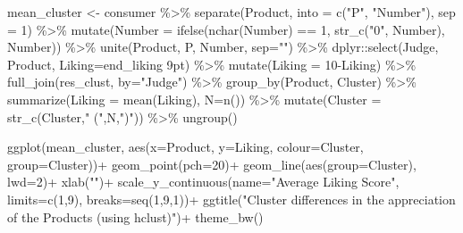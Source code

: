 \documentclass[
]{book}
\newenvironment{Shaded}{\begin{snugshade}}{\end{snugshade}}
\newcommand{\AttributeTok}[1]{\textcolor[rgb]{0.77,0.63,0.00}{#1}}
\newcommand{\DecValTok}[1]{\textcolor[rgb]{0.00,0.00,0.81}{#1}}
\newcommand{\FunctionTok}[1]{\textcolor[rgb]{0.00,0.00,0.00}{#1}}
\newcommand{\NormalTok}[1]{#1}
\newcommand{\OtherTok}[1]{\textcolor[rgb]{0.56,0.35,0.01}{#1}}
\newcommand{\SpecialCharTok}[1]{\textcolor[rgb]{0.00,0.00,0.00}{#1}}
\newcommand{\StringTok}[1]{\textcolor[rgb]{0.31,0.60,0.02}{#1}}
\begin{document}
\begin{Shaded}
\begin{Highlighting}[]
\NormalTok{mean\_cluster }\OtherTok{\textless{}{-}}\NormalTok{ consumer }\SpecialCharTok{\%\textgreater{}\%} 
  \FunctionTok{separate}\NormalTok{(Product, }\AttributeTok{into =} \FunctionTok{c}\NormalTok{(}\StringTok{"P"}\NormalTok{, }\StringTok{"Number"}\NormalTok{), }\AttributeTok{sep =} \DecValTok{1}\NormalTok{) }\SpecialCharTok{\%\textgreater{}\%} 
  \FunctionTok{mutate}\NormalTok{(}\AttributeTok{Number =} \FunctionTok{ifelse}\NormalTok{(}\FunctionTok{nchar}\NormalTok{(Number) }\SpecialCharTok{==} \DecValTok{1}\NormalTok{, }\FunctionTok{str\_c}\NormalTok{(}\StringTok{"0"}\NormalTok{, Number), Number)) }\SpecialCharTok{\%\textgreater{}\%} 
  \FunctionTok{unite}\NormalTok{(Product, P, Number, }\AttributeTok{sep=}\StringTok{""}\NormalTok{) }\SpecialCharTok{\%\textgreater{}\%} 
\NormalTok{  dplyr}\SpecialCharTok{::}\FunctionTok{select}\NormalTok{(Judge, Product, }\AttributeTok{Liking=}\StringTok{\textasciigrave{}}\AttributeTok{end\_liking 9pt}\StringTok{\textasciigrave{}}\NormalTok{) }\SpecialCharTok{\%\textgreater{}\%}
  \FunctionTok{mutate}\NormalTok{(}\AttributeTok{Liking =} \DecValTok{10}\SpecialCharTok{{-}}\NormalTok{Liking) }\SpecialCharTok{\%\textgreater{}\%} 
  \FunctionTok{full\_join}\NormalTok{(res\_clust, }\AttributeTok{by=}\StringTok{"Judge"}\NormalTok{) }\SpecialCharTok{\%\textgreater{}\%} 
  \FunctionTok{group\_by}\NormalTok{(Product, Cluster) }\SpecialCharTok{\%\textgreater{}\%} 
  \FunctionTok{summarize}\NormalTok{(}\AttributeTok{Liking =} \FunctionTok{mean}\NormalTok{(Liking), }\AttributeTok{N=}\FunctionTok{n}\NormalTok{()) }\SpecialCharTok{\%\textgreater{}\%} 
  \FunctionTok{mutate}\NormalTok{(}\AttributeTok{Cluster =} \FunctionTok{str\_c}\NormalTok{(Cluster,}\StringTok{" ("}\NormalTok{,N,}\StringTok{")"}\NormalTok{)) }\SpecialCharTok{\%\textgreater{}\%} 
  \FunctionTok{ungroup}\NormalTok{()}

\FunctionTok{ggplot}\NormalTok{(mean\_cluster, }\FunctionTok{aes}\NormalTok{(}\AttributeTok{x=}\NormalTok{Product, }\AttributeTok{y=}\NormalTok{Liking, }\AttributeTok{colour=}\NormalTok{Cluster, }\AttributeTok{group=}\NormalTok{Cluster))}\SpecialCharTok{+}
  \FunctionTok{geom\_point}\NormalTok{(}\AttributeTok{pch=}\DecValTok{20}\NormalTok{)}\SpecialCharTok{+}
  \FunctionTok{geom\_line}\NormalTok{(}\FunctionTok{aes}\NormalTok{(}\AttributeTok{group=}\NormalTok{Cluster), }\AttributeTok{lwd=}\DecValTok{2}\NormalTok{)}\SpecialCharTok{+}
  \FunctionTok{xlab}\NormalTok{(}\StringTok{""}\NormalTok{)}\SpecialCharTok{+}
  \FunctionTok{scale\_y\_continuous}\NormalTok{(}\AttributeTok{name=}\StringTok{"Average Liking Score"}\NormalTok{, }\AttributeTok{limits=}\FunctionTok{c}\NormalTok{(}\DecValTok{1}\NormalTok{,}\DecValTok{9}\NormalTok{), }\AttributeTok{breaks=}\FunctionTok{seq}\NormalTok{(}\DecValTok{1}\NormalTok{,}\DecValTok{9}\NormalTok{,}\DecValTok{1}\NormalTok{))}\SpecialCharTok{+}
  \FunctionTok{ggtitle}\NormalTok{(}\StringTok{"Cluster differences in the appreciation of the Products (using hclust)"}\NormalTok{)}\SpecialCharTok{+}
  \FunctionTok{theme\_bw}\NormalTok{()}
\end{Highlighting}
\end{Shaded}
\end{document}
